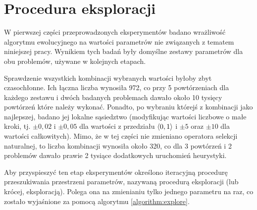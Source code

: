 \documentclass[./FM_mgr.tex]{subfiles}
\begin{document}
\section{Procedura eksploracji} \label{appendix:explore}

W pierwszej części przeprowadzonych eksperymentów badano wrażliwość algorytmu ewolucyjnego na wartości parametrów nie związanych z tematem niniejszej pracy.
Wynikiem tych badań były domyślne zestawy parametrów dla obu problemów, używane w kolejnych etapach.

Sprawdzenie wszystkich kombinacji wybranych wartości byłoby zbyt czasochłonne.
Ich łączna liczba wynosiła 972, co przy 5 powtórzeniach dla każdego zestawu i dwóch badanych problemach dawało około 10 tysięcy powtórzeń które należy wykonać.
Ponadto, po wybraniu którejś z kombinacji jako najlepszej, badano jej lokalne sąsiedztwo (modyfikując wartości liczbowe o małe kroki, tj. $\pm0,02$ i $\pm0,05$ dla wartości z przedziału $\langle0, 1\rangle$ i $\pm5$ oraz $\pm10$ dla wartości całkowitych).
Mimo, że w tej części nie zmieniano operatora selekcji naturalnej, to liczba kombinacji wynosiła około 320, co dla 3 powtórzeń i 2 problemów dawało prawie 2 tysiące dodatkowych uruchomień heurystyki.

Aby przyspieszyć ten etap eksperymentów określono iteracyjną procedurę przeszukiwania przestrzeni parametrów, nazywaną procedurą eksploracji (lub krócej, eksploracją).
Polega ona na zmienianiu tylko jednego parametru na raz, co zostało wyjaśnione za pomocą algorytmu \ref{algorithm:explore}.

\end{document}
